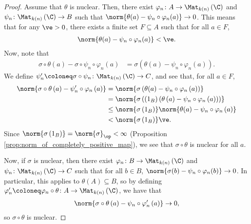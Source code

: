\begin{proof}
  Assume that $\theta$ is nuclear. Then, there exist $\varphi_n\colon A\rightarrow \Mat_{k(n)}\left( \C \right)$ and $\psi_n\colon \Mat_{k(n)}\left( \C \right)\rightarrow B$ such that $\norm{\theta(a) - \psi_n\circ\varphi_n(a)} \rightarrow 0$. This means that for any $\ve > 0$, there exists a finite set $F\subseteq A$ such that for all $a\in F$,
  \begin{align*}
    \norm{\theta(a) - \psi_n\circ\varphi_n(a)} < \ve.
  \end{align*}
  Now, note that
  \begin{align*}
    \sigma\circ\theta(a) - \sigma\circ\psi_n\circ\varphi_n(a) &= \sigma\left( \theta(a) - \psi_n\circ \varphi_n(a) \right).
  \end{align*}
  We define $\psi_n' \coloneq \sigma\circ \psi_n\colon \Mat_{k(n)}\left( \C \right)\rightarrow C$, and see that, for all $a\in F$,
  \begin{align*}
    \norm{\sigma\circ\theta\left( a \right) - \psi_n'\circ\varphi_n\left( a \right)} &= \norm{\sigma\left( \theta(a) - \psi_n\circ\varphi_n\left( a \right) \right)}\\
                                                                                     &= \norm{\sigma\left( \left( 1_B \right)\left( \theta\left( a \right) - \psi_n\circ\varphi_n\left( a \right) \right) \right)}\\
                                                                                     &\leq \norm{\sigma\left(1_B\right)}\norm{\theta(a) - \psi_n\circ\varphi_n\left( a \right)}\\
                                                                                     &< \norm{\sigma\left(1_B\right)} \ve.
  \end{align*}
  Since $\norm{\sigma\left( 1_B \right)} = \norm{\sigma}_{\op} < \infty$ (Proposition \ref{prop:norm_of_completely_positive_map}), we see that $\sigma\circ\theta$ is nuclear for all $a$.\newline

  Now, if $\sigma$ is nuclear, then there exist $\varphi_n\colon B\rightarrow \Mat_{k(n)}\left( \C \right)$ and $\psi_n\colon \Mat_{k(n)}\left( \C \right)\rightarrow C$ such that for all $b\in B$, $\norm{\sigma(b) - \psi_n\circ\varphi_n(b)} \rightarrow 0$. In particular, this applies to $\theta(A)\subseteq B$, so by defining $\varphi_n' \coloneq \varphi_n\circ\theta\colon A \rightarrow \Mat_{k(n)}\left( \C \right)$, we have that
  \begin{align*}
    \norm{\sigma\circ\theta\left( a \right) - \psi_n\circ\varphi_n'\left( a \right)}\rightarrow 0,
  \end{align*}
  so $\sigma\circ\theta$ is nuclear.
\end{proof}
